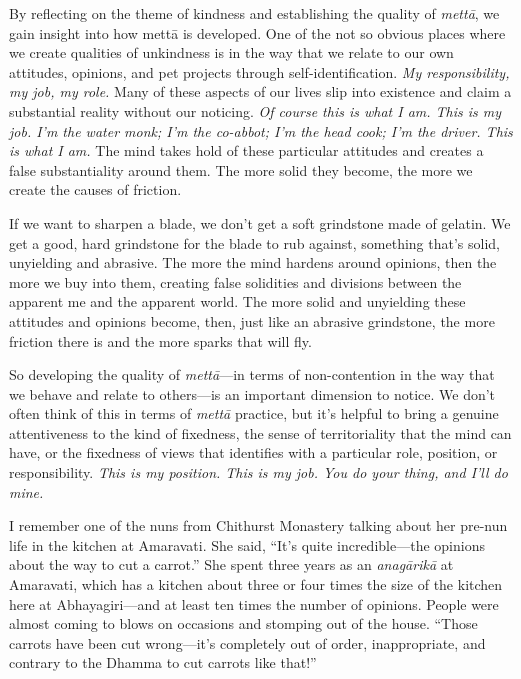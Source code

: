 
By reflecting on the theme of kindness and establishing the quality of 
\emph{mettā}, we gain insight into how mettā is developed. One of the 
not so obvious places where we create qualities of unkindness is in the 
way that we relate to our own attitudes, opinions, and pet projects 
through self-identification. \emph{My responsibility, my job, my role.} 
Many of these aspects of our lives slip into existence and claim a 
substantial reality without our noticing. \emph{Of course this is what 
I am. This is my job. I'm the water monk; I'm the co-abbot; I'm the 
head cook; I'm the driver. This is what I am.} The mind takes hold of 
these particular attitudes and creates a false substantiality around 
them. The more solid they become, the more we create the causes of 
friction.

If we want to sharpen a blade, we don't get a soft grindstone made of 
gelatin. We get a good, hard grindstone for the blade to rub against, 
something that's solid, unyielding and abrasive. The more the mind 
hardens around opinions, then the more we buy into them, creating false 
solidities and divisions between the apparent me and the apparent 
world. The more solid and unyielding these attitudes and opinions 
become, then, just like an abrasive grindstone, the more friction there 
is and the more sparks that will fly.

So developing the quality of \emph{mettā}---in terms of non-contention 
in the way that we behave and relate to others---is an important 
dimension to notice. We don't often think of this in terms of 
\emph{mettā} practice, but it's helpful to bring a genuine 
attentiveness to the kind of fixedness, the sense of territoriality 
that the mind can have, or the fixedness of views that identifies with 
a particular role, position, or responsibility. \emph{This is my 
position. This is my job. You do your thing, and I'll do mine.}

I remember one of the nuns from Chithurst Monastery talking about her 
pre-nun life in the kitchen at Amaravati. She said, ``It's quite 
incredible---the opinions about the way to cut a carrot.'' She spent 
three years as an \emph{anagārikā} at Amaravati, which has a kitchen 
about three or four times the size of the kitchen here at 
Abhayagiri---and at least ten times the number of opinions. People were 
almost coming to blows on occasions and stomping out of the house. 
``Those carrots have been cut wrong---it's completely out of order, 
inappropriate, and contrary to the Dhamma to cut carrots like that!''

